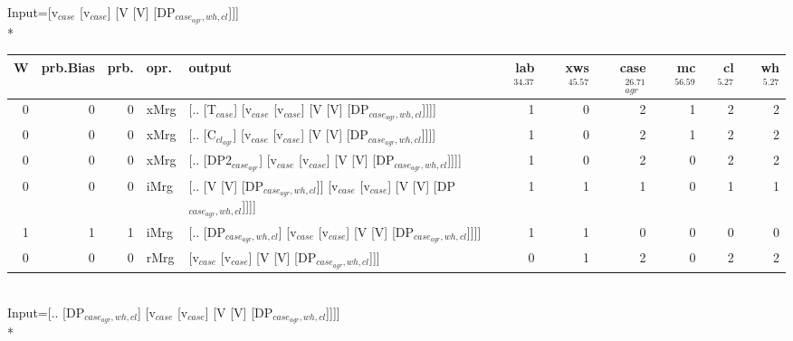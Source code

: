 \begingroup\scriptsize Input=[v$_{case}$ [v$_{case}$] [V [V] [DP$_{case_{agr},wh,cl}$]]]\\*
\begin{tabularx}{\linewidth}{rrrlXrrrrrr}
\hline
   W &   prb.Bias &   prb. & opr.   & output                                                                         &   lab$^{34.37}$ &   xws$^{45.57}$ &   case$_{agr}^{26.71}$ &   mc$^{56.59}$ &   cl$^{5.27}$ &   wh$^{5.27}$ \\
\hline
   0 &       0 &   0 & xMrg & [.. [T$_{case}$] [v$_{case}$ [v$_{case}$] [V [V] [DP$_{case_{agr},wh,cl}$]]]]                    &             1 &             0 &                  2 &            1 &        2 &        2 \\
   0 &       0 &   0 & xMrg & [.. [C$_{cl_{agr}}$] [v$_{case}$ [v$_{case}$] [V [V] [DP$_{case_{agr},wh,cl}$]]]]                  &             1 &             0 &                  2 &            1 &        2 &        2 \\
   0 &       0 &   0 & xMrg & [.. [DP2$_{case_{agr}}$] [v$_{case}$ [v$_{case}$] [V [V] [DP$_{case_{agr},wh,cl}$]]]]              &             1 &             0 &                  2 &            0 &        2 &        2 \\
   0 &       0 &   0 & iMrg & [.. [V [V] [DP$_{case_{agr},wh,cl}$]] [v$_{case}$ [v$_{case}$] [V [V] [DP$_{case_{agr},wh,cl}$]]]] &             1 &             1 &                  1 &            0 &        1 &        1 \\
   1 &       1 &   1 & iMrg & [.. [DP$_{case_{agr},wh,cl}$] [v$_{case}$ [v$_{case}$] [V [V] [DP$_{case_{agr},wh,cl}$]]]]         &             1 &             1 &                  0 &            0 &        0 &        0 \\
   0 &       0 &   0 & rMrg & [v$_{case}$ [v$_{case}$] [V [V] [DP$_{case_{agr},wh,cl}$]]]                                  &             0 &             1 &                  2 &            0 &        2 &        2 \\
\hline
\end{tabularx}\endgroup\\
\begingroup\scriptsize Input=[.. [DP$_{case_{agr},wh,cl}$] [v$_{case}$ [v$_{case}$] [V [V] [DP$_{case_{agr},wh,cl}$]]]]\\*
